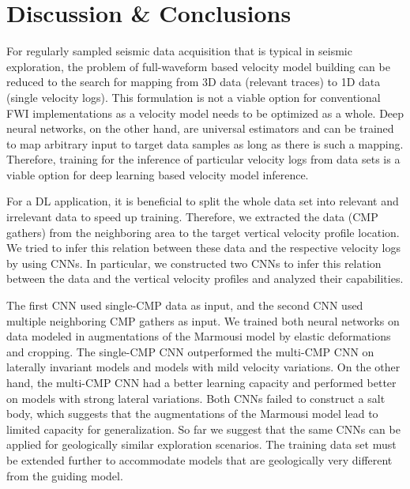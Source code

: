 \documentclass[manuscript]{geophysics}
\begin{document}



\section{Discussion \& Conclusions}

For regularly sampled seismic data acquisition that is typical in seismic exploration, the problem of full-waveform based velocity model building can be reduced to the search for mapping from 3D data (relevant traces) to 1D data (single velocity logs). This formulation is not a viable option for conventional FWI implementations as a velocity model needs to be optimized as a whole. Deep neural networks, on the other hand, are universal estimators and can be trained to map arbitrary input to target data samples as long as there is such a mapping. Therefore, training for the inference of particular velocity logs from data sets is a viable option for deep learning based velocity model inference.

For a DL application, it is beneficial to split the whole data set into relevant and irrelevant data to speed up training. Therefore, we extracted the data (CMP gathers) from the neighboring area to the target vertical velocity profile location. We tried to infer this relation between these data and the respective velocity logs by using CNNs. In particular, we constructed two CNNs to infer this relation between the data and the vertical velocity profiles and analyzed their capabilities.

The first CNN used single-CMP data as input, and the second CNN used multiple neighboring CMP gathers as input. We trained both neural networks on data modeled in augmentations of the Marmousi model by elastic deformations and cropping. The single-CMP CNN outperformed the multi-CMP CNN on laterally invariant models and models with mild velocity variations. On the other hand, the multi-CMP CNN had a better learning capacity and performed better on models with strong lateral variations. Both CNNs failed to construct a salt body, which suggests that the augmentations of the Marmousi model lead to limited capacity for generalization. So far we suggest that the same CNNs can be applied for geologically similar exploration scenarios. The training data set must be extended further to accommodate models that are geologically very different from the guiding model.   
\end{document}
